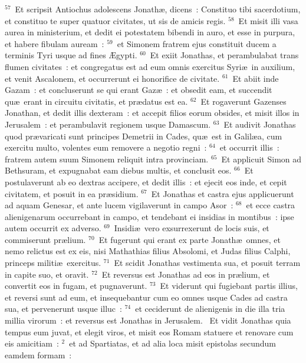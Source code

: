 ${}^{57}$~Et scripsit Antiochus adolescens Jonath\ae , dicens~: Constituo tibi sacerdotium, et constituo te super quatuor civitates, ut sis de amicis regis.
${}^{58}$~Et misit illi vasa aurea in ministerium, et dedit ei potestatem bibendi in auro, et esse in purpura, et habere fibulam auream~:
${}^{59}$~et Simonem fratrem ejus constituit ducem a terminis Tyri usque ad fines \AE gypti.
${}^{60}$~Et exiit Jonathas, et perambulabat trans flumen civitates~: et congregatus est ad eum omnis exercitus Syri\ae\ in auxilium, et venit Ascalonem, et occurrerunt ei honorifice de civitate.
${}^{61}$~Et abiit inde Gazam~: et concluserunt se qui erant Gaz\ae~: et obsedit eam, et succendit qu\ae\ erant in circuitu civitatis, et pr\ae datus est ea.
${}^{62}$~Et rogaverunt Gazenses Jonathan, et dedit illis dexteram~: et accepit filios eorum obsides, et misit illos in Jerusalem~: et perambulavit regionem usque Damascum.
${}^{63}$~Et audivit Jonathas quod pr\ae varicati sunt principes Demetrii in Cades, qu\ae\ est in Galil\ae a, cum exercitu multo, volentes eum removere a negotio regni~:
${}^{64}$~et occurrit illis~: fratrem autem suum Simonem reliquit intra provinciam.
${}^{65}$~Et applicuit Simon ad Bethsuram, et expugnabat eam diebus multis, et conclusit eos.
${}^{66}$~Et postulaverunt ab eo dextras accipere, et dedit illis~: et ejecit eos inde, et cepit civitatem, et posuit in ea pr\ae sidium.
${}^{67}$~Et Jonathas et castra ejus applicuerunt ad aquam Genesar, et ante lucem vigilaverunt in campo Asor~:
${}^{68}$~et ecce castra alienigenarum occurrebant in campo, et tendebant ei insidias in montibus~: ipse autem occurrit ex adverso.
${}^{69}$~Insidi\ae\ vero exsurrexerunt de locis suis, et commiserunt pr\ae lium.
${}^{70}$~Et fugerunt qui erant ex parte Jonath\ae\ omnes, et nemo relictus est ex eis, nisi Mathathias filius Absolomi, et Judas filius Calphi, princeps militi\ae\ exercitus.
${}^{71}$~Et scidit Jonathas vestimenta sua, et posuit terram in capite suo, et oravit.
${}^{72}$~Et reversus est Jonathas ad eos in pr\ae lium, et convertit eos in fugam, et pugnaverunt.
${}^{73}$~Et viderunt qui fugiebant partis illius, et reversi sunt ad eum, et insequebantur cum eo omnes usque Cades ad castra sua, et pervenerunt usque illuc~:
${}^{74}$~et ceciderunt de alienigenis in die illa tria millia virorum~: et reversus est Jonathas in Jerusalem.
~Et vidit Jonathas quia tempus eum juvat, et elegit viros, et misit eos Romam statuere et renovare cum eis amicitiam~:
${}^{2}$~et ad Spartiatas, et ad alia loca misit epistolas secundum eamdem formam~:
